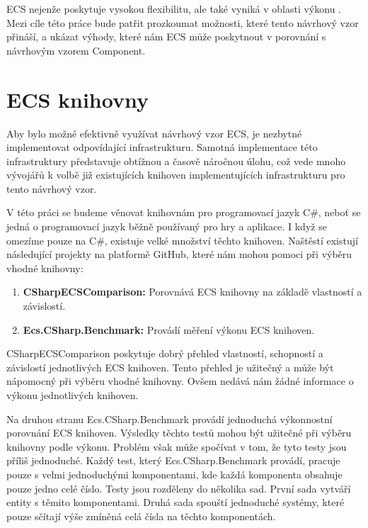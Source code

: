 ECS nejenže poskytuje vysokou flexibilitu, ale také vyniká v oblasti výkonu . Mezi cíle této práce bude patřit prozkoumat možnosti, které tento návrhový vzor přináší, a ukázat výhody, které nám ECS může poskytnout v porovnání s návrhovým vzorem Component.

\section{ECS knihovny}
Aby bylo možné efektivně využívat návrhový vzor ECS, je nezbytné implementovat odpovídající infrastrukturu. Samotná implementace této infrastruktury představuje obtížnou a časově náročnou úlohu, což vede mnoho vývojářů k volbě již existujících knihoven implementujících infrastrukturu pro tento návrhový vzor.

V této práci se budeme věnovat knihovnám pro programovací jazyk C\#, neboť se jedná o programovací jazyk běžně používaný pro hry a aplikace. I když se omezíme pouze na C\#, existuje velké množství těchto knihoven. Naštěstí existují následující projekty na platformě GitHub, které nám mohou pomoci při výběru vhodné knihovny:

\begin{enumerate}
    \item \textbf{CSharpECSComparison:} Porovnává ECS knihovny na základě vlastností a závislostí.
    \item \textbf{Ecs.CSharp.Benchmark:} Provádí měření výkonu ECS knihoven.
\end{enumerate}

CSharpECSComparison poskytuje dobrý přehled vlastností, schopností a závislostí jednotlivých ECS knihoven. Tento přehled je užitečný a může být nápomocný při výběru vhodné knihovny. Ovšem nedává nám žádné informace o výkonu jednotlivých knihoven.

Na druhou stranu Ecs.CSharp.Benchmark provádí jednoduchá výkonnostní porovnání ECS knihoven. Výsledky těchto testů mohou být užitečné při výběru knihovny podle výkonu. Problém však může spočívat v tom, že tyto testy jsou příliš jednoduché. Každý test, který Ecs.CSharp.Benchmark provádí, pracuje pouze s velmi jednoduchými komponentami, kde každá komponenta obsahuje pouze jedno celé číslo. Testy jsou rozděleny do několika sad. První sada vytváří entity s těmito komponentami. Druhá sada spouští jednoduché systémy, které pouze sčítají výše zmíněná celá čísla na těchto komponentách.

